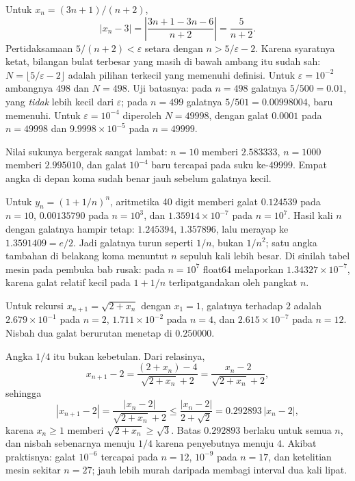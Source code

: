 Untuk $x_n=(3n+1)/(n+2)$,
\[
|x_n-3| = \left|\frac{3n+1-3n-6}{n+2}\right| = \frac{5}{n+2}.
\]
Pertidaksamaan $5/(n+2)<\varepsilon$ setara dengan $n>5/\varepsilon-2$. Karena
syaratnya ketat, bilangan bulat terbesar yang masih di bawah ambang itu sudah sah:
$N=\lfloor 5/\varepsilon-2 \rfloor$ adalah pilihan terkecil yang memenuhi definisi.
Untuk $\varepsilon=10^{-2}$ ambangnya $498$ dan $N=498$. Uji batasnya: pada $n=498$
galatnya $5/500=0.01$, yang \emph{tidak} lebih kecil dari $\varepsilon$; pada $n=499$
galatnya $5/501=0.00998004$, baru memenuhi. Untuk $\varepsilon=10^{-4}$ diperoleh
$N=49998$, dengan galat $0.0001$ pada $n=49998$ dan $9.9998 \times 10^{-5}$ pada
$n=49999$.

Nilai sukunya bergerak sangat lambat: $n=10$ memberi $2.583333$, $n=1000$ memberi
$2.995010$, dan galat $10^{-4}$ baru tercapai pada suku ke-$49999$. Empat angka di
depan koma sudah benar jauh sebelum galatnya kecil.


Untuk $y_n=(1+1/n)^n$, aritmetika 40 digit memberi galat $0.124539$ pada $n=10$,
$0.00135790$ pada $n=10^3$, dan $1.35914 \times 10^{-7}$ pada $n=10^7$. Hasil kali
$n$ dengan galatnya hampir tetap: $1.245394$, $1.357896$, lalu merayap ke
$1.3591409 = e/2$. Jadi galatnya turun seperti $1/n$, bukan $1/n^2$; satu angka
tambahan di belakang koma menuntut $n$ sepuluh kali lebih besar. Di sinilah tabel
mesin pada pembuka bab rusak: pada $n=10^7$ float64 melaporkan
$1.34327 \times 10^{-7}$, karena galat relatif kecil pada $1+1/n$
terlipatgandakan oleh pangkat $n$.

Untuk rekursi $x_{n+1}=\sqrt{2+x_n}$ dengan $x_1=1$, galatnya terhadap $2$ adalah
$2.679 \times 10^{-1}$ pada $n=2$, $1.711 \times 10^{-2}$ pada $n=4$, dan
$2.615 \times 10^{-7}$ pada $n=12$. Nisbah dua galat berurutan menetap di
$0.250000$.

Angka $1/4$ itu bukan kebetulan. Dari relasinya,
\[
x_{n+1}-2 = \frac{(2+x_n)-4}{\sqrt{2+x_n}+2}
= \frac{x_n-2}{\sqrt{2+x_n}+2},
\]
sehingga
\[
|x_{n+1}-2| = \frac{|x_n-2|}{\sqrt{2+x_n}+2}
\le \frac{|x_n-2|}{2+\sqrt{2}} = 0.292893\,|x_n-2| ,
\]
karena $x_n \ge 1$ memberi $\sqrt{2+x_n} \ge \sqrt{3}$. Batas $0.292893$ berlaku
untuk semua $n$, dan nisbah sebenarnya menuju $1/4$ karena penyebutnya menuju $4$.
Akibat praktisnya: galat $10^{-6}$ tercapai pada $n=12$, $10^{-9}$ pada $n=17$, dan
ketelitian mesin sekitar $n=27$; jauh lebih murah daripada membagi interval dua kali
lipat.

